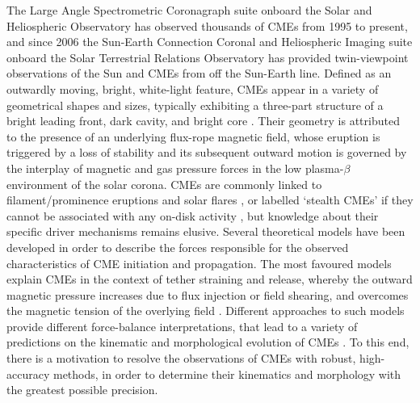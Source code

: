 \documentclass[preprint2]{aastex}
\begin{document}
The Large Angle Spectrometric Coronagraph suite \citep[LASCO;][]{1995SoPh..162..357B} onboard the Solar and Heliospheric Observatory \citep[SOHO;][]{1995SoPh..162....1D} has observed thousands of CMEs from 1995 to present, and since 2006 the Sun-Earth Connection Coronal and Heliospheric Imaging suite \citep[SECCHI;][]{2008SSRv..136...67H} onboard the Solar Terrestrial Relations Observatory \citep[STEREO;][]{2008SSRv..136....5K} has provided twin-viewpoint observations of the Sun and CMEs from off the Sun-Earth line. Defined as an outwardly moving, bright, white-light feature, CMEs appear in a variety of geometrical shapes and sizes, typically exhibiting a three-part structure of a bright leading front, dark cavity, and bright core \citep{1985JGR....90..275I}. Their geometry is attributed to the presence of an underlying flux-rope magnetic field, whose eruption is triggered by a loss of stability and its subsequent outward motion is governed by the interplay of magnetic and gas pressure forces in the low plasma-$\beta$ environment of the solar corona. CMEs are commonly linked to filament/prominence eruptions and solar flares \citep{2002ApJ...581..694M, 2002ApJ...566L.117Z}, or labelled `stealth CMEs' if they cannot be associated with any on-disk activity \citep{2009ApJ...701..283R}, but knowledge about their specific driver mechanisms remains elusive. Several theoretical models have been developed in order to describe the forces responsible for the observed characteristics of CME initiation and propagation. The most favoured models explain CMEs in the context of tether straining and release, whereby the outward magnetic pressure increases  due to flux injection or field shearing, and overcomes the magnetic tension of the overlying field \citep{2001AGUGM.125..143K}. Different approaches to such models provide different force-balance interpretations, that lead to a variety of predictions on the kinematic and morphological evolution of CMEs \citep[e.g.][]{2002A&ARv..10..313P, 2003JGRA..108.1410C, 2006PhRvL..96y5002K, 2008ApJ...683.1192L}. To this end, there is a motivation to resolve the observations of CMEs with robust, high-accuracy methods, in order to determine their kinematics and morphology with the greatest possible precision.
\end{document}
